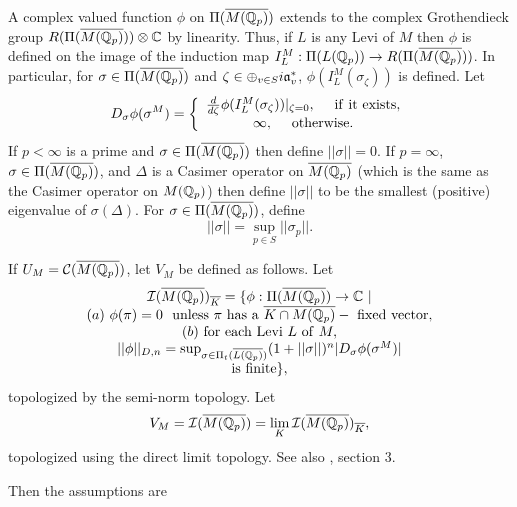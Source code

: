 A complex valued function $\phi$ on
$\Pi(\overline{M({\Bbb{Q}}_p)})$ extends to the
complex Grothendieck group
$R(\Pi(\overline{M({\Bbb{Q}}_p)}))\otimes {\Bbb{C}}$ by linearity.
Thus, if $L$ is any Levi of $M$ then $\phi$ is defined on the image of
the induction map
$I_L^M: \Pi(L({\Bbb{Q}}_p))\rightarrow R(\Pi(\overline{M({\Bbb{Q}}_p)}))$.
In particular, for $\sigma\in \Pi(\overline{M({\Bbb{Q}}_p)})$ and
$\zeta\in \oplus_{v\in S}i{\frak{a}}^*_v$, $\phi(I_L^M(\sigma_\zeta))$ is
defined. Let
\begin{equation}
D_\sigma \phi(\sigma^M)=
\left\{
\begin{array}{c}
{d\over d\zeta}\phi(I_L^M(\sigma_\zeta))|_{\zeta =0},
\ \ \ \ {\rm if\ it\ exists},\\
\infty,\ \ \ \ {\rm otherwise}.
\end{array}
\right.
\end{equation}
If $p<\infty$ is a prime and
$\sigma\in \Pi(\overline{M({\Bbb{Q}}_p)})$ then define
$||\sigma||=0$. If $p=\infty$,
$\sigma\in \Pi(\overline{M({\Bbb{Q}}_p)})$,
and $\Delta$
is a Casimer operator on $\overline{M({\Bbb{Q}}_p)}$
(which is the same as the Casimer operator on
$M({\Bbb{Q}}_p)$)
then define $||\sigma||$ to be the
smallest (positive) eigenvalue of $\sigma(\Delta)$. For
$\sigma\in \Pi(\overline{M({\Bbb{Q}}_p)})$, define
\[
||\sigma||=\sup_{p\in S}||\sigma_p||.
\]

If $U_M={\cal{C}}(\overline{M({\Bbb{Q}}_p)})$, let
$V_M$ be defined as follows.
Let
\[
\begin{array}{c}
{\cal{I}}(\overline{M({\Bbb{Q}}_p)})_{\overline{K}}
=\{\phi: \Pi(\overline{M({\Bbb{Q}}_p)})\rightarrow {\Bbb{C}} \ | \\
(a) \ \phi(\pi)=0\ {\rm \ unless\ }\pi{\rm \ has\ a\ }
\overline{K\cap M({\Bbb{Q}}_p)}-{\rm \ fixed\ vector},\\
(b)\ {\rm for \ each\ Levi\ }L{\rm\ of\ }M,\\
||\phi||_{D,n}=\sup_{\sigma\in \Pi_t(\overline{L({\Bbb{Q}}_p)})}
(1+||\sigma||)^n|D_\sigma \phi(\sigma^M)|\\
{\rm is\ finite}\},
\end{array}
\]
topologized by the semi-norm topology. Let
\begin{equation}
V_M=
{\cal{I}}(\overline{M({\Bbb{Q}}_p)})
=\lim_{K}{\cal{I}}(\overline{M({\Bbb{Q}}_p)})_{\overline{K}},
\end{equation}
topologized using the direct limit topology.
See also \cite{A16}, section 3.

Then the assumptions are

